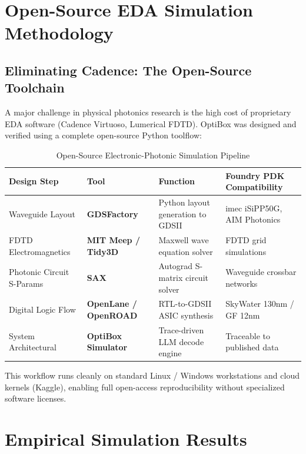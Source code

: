 \documentclass[11pt,a4paper]{report}
\begin{document}
\chapter{Open-Source EDA Simulation Methodology}

\section{Eliminating Cadence: The Open-Source Toolchain}
A major challenge in physical photonics research is the high cost of proprietary EDA software (Cadence Virtuoso, Lumerical FDTD). OptiBox was designed and verified using a complete open-source Python toolflow:

\begin{table}[htbp]
\centering
\caption{Open-Source Electronic-Photonic Simulation Pipeline}
\label{tab:tools}
\begin{tabular}{llll}
\toprule
Design Step & Tool & Function & Foundry PDK Compatibility \\
\midrule
Waveguide Layout & \textbf{GDSFactory} & Python layout generation to GDSII & imec iSiPP50G, AIM Photonics \\
FDTD Electromagnetics & \textbf{MIT Meep / Tidy3D} & Maxwell wave equation solver & FDTD grid simulations \\
Photonic Circuit S-Params & \textbf{SAX} & Autograd S-matrix circuit solver & Waveguide crossbar networks \\
Digital Logic Flow & \textbf{OpenLane / OpenROAD} & RTL-to-GDSII ASIC synthesis & SkyWater 130nm / GF 12nm \\
System Architectural & \textbf{OptiBox Simulator} & Trace-driven LLM decode engine & Traceable to published data \\
\bottomrule
\end{tabular}
\end{table}

This workflow runs cleanly on standard Linux / Windows workstations and cloud kernels (Kaggle), enabling full open-access reproducibility without specialized software licenses.

\chapter{Empirical Simulation Results}
\end{document}
